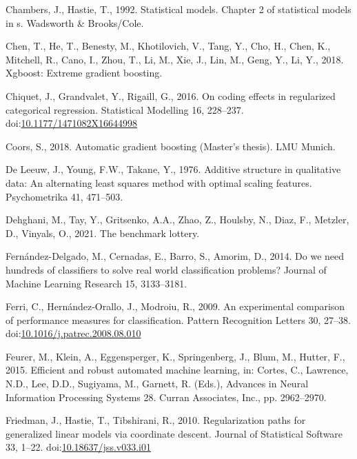 \documentclass[smallextended]{svjour3}       %
\newlength{\cslhangindent}
\newlength{\cslentryspacingunit} %
\newenvironment{CSLReferences}[2] %
 {%
  \setlength{\parindent}{0pt}
  \ifodd #1
  \let\oldpar\par
  \def\par{\hangindent=\cslhangindent\oldpar}
  \fi
  \setlength{\parskip}{#2\cslentryspacingunit}
 }%
 {}
\begin{document}
\begin{CSLReferences}{1}{0}
\leavevmode{}%
Chambers, J., Hastie, T., 1992. Statistical models. Chapter 2 of statistical models in s. Wadsworth \& Brooks/Cole.

\leavevmode{}%
Chen, T., He, T., Benesty, M., Khotilovich, V., Tang, Y., Cho, H., Chen, K., Mitchell, R., Cano, I., Zhou, T., Li, M., Xie, J., Lin, M., Geng, Y., Li, Y., 2018. Xgboost: Extreme gradient boosting.

\leavevmode{}%
Chiquet, J., Grandvalet, Y., Rigaill, G., 2016. On coding effects in regularized categorical regression. Statistical Modelling 16, 228--237. doi:\href{https://doi.org/10.1177/1471082X16644998}{10.1177/1471082X16644998}

\leavevmode{}%
Coors, S., 2018. Automatic gradient boosting (Master's thesis). LMU Munich.

\leavevmode{}%
De Leeuw, J., Young, F.W., Takane, Y., 1976. Additive structure in qualitative data: An alternating least squares method with optimal scaling features. Psychometrika 41, 471--503.

\leavevmode{}%
Dehghani, M., Tay, Y., Gritsenko, A.A., Zhao, Z., Houlsby, N., Diaz, F., Metzler, D., Vinyals, O., 2021. The benchmark lottery.

\leavevmode{}%
Fernández-Delgado, M., Cernadas, E., Barro, S., Amorim, D., 2014. Do we need hundreds of classifiers to solve real world classification problems? Journal of Machine Learning Research 15, 3133--3181.

\leavevmode{}%
Ferri, C., Hernández-Orallo, J., Modroiu, R., 2009. An experimental comparison of performance measures for classification. Pattern Recognition Letters 30, 27--38. doi:\href{https://doi.org/10.1016/j.patrec.2008.08.010}{10.1016/j.patrec.2008.08.010}

\leavevmode{}%
Feurer, M., Klein, A., Eggensperger, K., Springenberg, J., Blum, M., Hutter, F., 2015. Efficient and robust automated machine learning, in: Cortes, C., Lawrence, N.D., Lee, D.D., Sugiyama, M., Garnett, R. (Eds.), Advances in Neural Information Processing Systems 28. Curran Associates, Inc., pp. 2962--2970.

\leavevmode{}%
Friedman, J., Hastie, T., Tibshirani, R., 2010. Regularization paths for generalized linear models via coordinate descent. Journal of Statistical Software 33, 1--22. doi:\href{https://doi.org/10.18637/jss.v033.i01}{10.18637/jss.v033.i01}


\end{CSLReferences}
\end{document}
